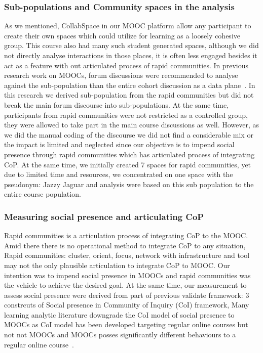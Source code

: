 \documentclass[manuscript,screen,review]{acmart}
\begin{document}
\subsubsection{Sub-populations and Community spaces in the analysis}
As we mentioned, CollabSpace in our MOOC platform allow any participant to create their own spaces which could utilize for learning as a loosely cohesive group. This course also had many such student generated spaces, although we did not directly analyse interactions in those places, it is often less engaged besides it act as a feature with out articulated process of rapid communities. 
In previous research work on MOOCs, forum discussions were recommended to analyse against the sub-population than the entire cohort discussion as a data plane~\cite{poquet2018social}. In this research we derived sub-population from the rapid communities but did not break the main forum discourse into sub-populations. At the same time, participants from rapid communities were not restricted as a controlled group, they were allowed to take part in the main course discussions as well. However, as we did the manual coding of the discourse we did not find a considerable mix or the impact is  limited and neglected since our objective is to impend social presence through rapid communities which has articulated process of integrating CoP. At the same time, we initially created 7 spaces for rapid communities, yet due to limited time and resources, we concentrated on one space with the pseudonym: Jazzy Jaguar and analysis were based on this sub population to the entire course population. 

\subsubsection{Measuring social presence and articulating CoP}
Rapid communities is a articulation process of integrating CoP to the MOOC. Amid there there is no operational method to integrate CoP to any situation, Rapid communities: cluster, orient, focus, network with infrastructure and tool may not the only plausible articulation to integrate CoP to MOOC. Our intention was to impend social presence in MOOCs and rapid communities was the vehicle to achieve the desired goal. At the same time, our measurement to assess social presence were derived from part of previous validate framework: 3 constrcuts of Social presence in Community of Inquiry (CoI) framework, Many learning analytic literature downgrade the CoI model of social presence to MOOCs as CoI model has been developed targeting regular online courses but not not MOOCs and MOOCs posses significantly different behaviours to a regular online course~\cite{poquet2018mooc}.
\end{document}
